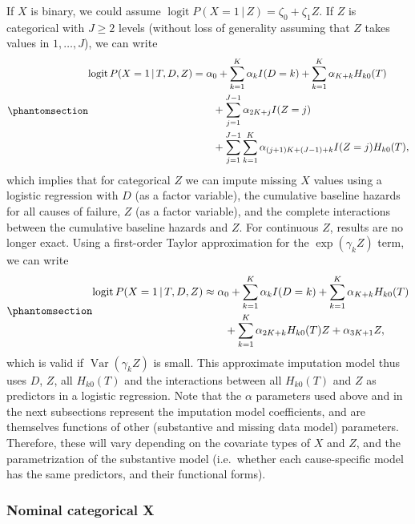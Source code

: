 \documentclass[
  letterpaper,
  paper=240mm:170mm,
  twoside=true,
  open=right,
  fontsize=10pt,
  pagesize=false,
  BCOR=15mm,
  DIV=14,
  headinclude=true,
  footinclude=false,
  headsepline=on]{scrbook}
\DeclareMathOperator{\logit}{logit}
\DeclareMathOperator{\Var}{Var}
\newcommand{\given}{\,|\,}
\begin{document}
If \(X\) is binary, we could assume
\(\logit P(X = 1 \given Z) = \zeta_0 + \zeta_1 Z\). If \(Z\) is
categorical with \(J \geq 2\) levels (without loss of generality
assuming that \(Z\) takes values in \(1, \ldots, J\)), we can write
\begin{equation}\phantomsection\label{eq-Xbin-Zcat}{
\begin{aligned}
    \logit P(X = 1 \given T, D, Z) &= \alpha_0 + \sum^K_{k = 1}\alpha_k I(D=k) + \sum^K_{k = 1} \alpha_{K+k} H_{k0}(T) \\
    &\qquad + \sum^{J-1}_{j=1}\alpha_{2K + j}I(Z = j) \\
    &\qquad + \sum^{J-1}_{j=1} \sum^K_{k = 1} \alpha_{(j+1)K + (J-1) + k}I(Z = j) H_{k0}(T),
\end{aligned}
}\end{equation} which implies that for categorical \(Z\) we can impute
missing \(X\) values using a logistic regression with \(D\) (as a factor
variable), the cumulative baseline hazards for all causes of failure,
\(Z\) (as a factor variable), and the complete interactions between the
cumulative baseline hazards and \(Z\). For continuous \(Z\), results are
no longer exact. Using a first-order Taylor approximation for the
\(\exp(\gamma_k Z)\) term, we can write
\begin{equation}\phantomsection\label{eq-Xbin-Zcontin}{
\begin{aligned}
    \logit P(X = 1 \given T, D, Z) &\approx \alpha_0  + \sum^K_{k = 1} \alpha_{k} I(D=k) + \sum^K_{k = 1} \alpha_{K + k} H_{k0}(T) \\
    &\qquad + \sum^K_{k = 1} \alpha_{2K + k} H_{k0}(T) Z + \alpha_{3K + 1} Z,
\end{aligned}
}\end{equation} which is valid if \(\Var(\gamma_k Z)\) is small. This
approximate imputation model thus uses \(D\), \(Z\), all \(H_{k0}(T)\)
and the interactions between all \(H_{k0}(T)\) and \(Z\) as predictors
in a logistic regression. Note that the \(\alpha\) parameters used above
and in the next subsections represent the imputation model coefficients,
and are themselves functions of other (substantive and missing data
model) parameters. Therefore, these will vary depending on the covariate
types of \(X\) and \(Z\), and the parametrization of the substantive
model (i.e.~whether each cause-specific model has the same predictors,
and their functional forms).

\subsubsection{Nominal categorical X}\label{nominal-categorical-x}
\end{document}
